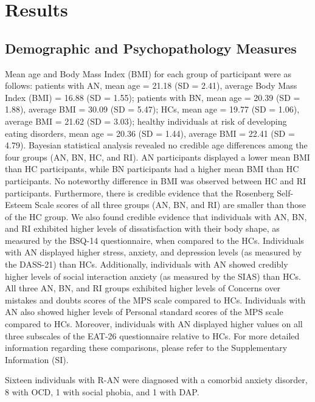 \documentclass[
  man,floatsintext]{apa6}
\begin{document}
\hypertarget{results}{%
\section{Results}\label{results}}

\hypertarget{demographic-and-psychopathology-measures}{%
\subsection{Demographic and Psychopathology Measures}\label{demographic-and-psychopathology-measures}}

Mean age and Body Mass Index (BMI) for each group of participant were as follows: patients with AN, mean age = 21.18 (SD = 2.41), average Body Mass Index (BMI) = 16.88 (SD = 1.55); patients with BN, mean age = 20.39 (SD = 1.88), average BMI = 30.09 (SD = 5.47); HCs, mean age = 19.77 (SD = 1.06), average BMI = 21.62 (SD = 3.03); healthy individuals at risk of developing eating disorders, mean age = 20.36 (SD = 1.44), average BMI = 22.41 (SD = 4.79).
Bayesian statistical analysis revealed no credible age differences among the four groups (AN, BN, HC, and RI). AN participants displayed a lower mean BMI than HC participants, while BN participants had a higher mean BMI than HC participants. No noteworthy difference in BMI was observed between HC and RI participants. Furthermore, there is credible evidence that the Rosenberg Self-Esteem Scale scores of all three groups (AN, BN, and RI) are smaller than those of the HC group. We also found credible evidence that individuals with AN, BN, and RI exhibited higher levels of dissatisfaction with their body shape, as measured by the BSQ-14 questionnaire, when compared to the HCs.
Individuals with AN displayed higher stress, anxiety, and depression levels (as measured by the DASS-21) than HCs. Additionally, individuals with AN showed credibly higher levels of social interaction anxiety (as measured by the SIAS) than HCs. All three AN, BN, and RI groups exhibited higher levels of Concerns over mistakes and doubts scores of the MPS scale compared to HCs. Individuals with AN also showed higher levels of Personal standard scores of the MPS scale compared to HCs. Moreover, individuals with AN displayed higher values on all three subscales of the EAT-26 questionnaire relative to HCs. For more detailed information regarding these comparisons, please refer to the Supplementary Information (SI).

Sixteen individuals with R-AN were diagnosed with a comorbid anxiety disorder, 8 with OCD, 1 with social phobia, and 1 with DAP.
\end{document}
